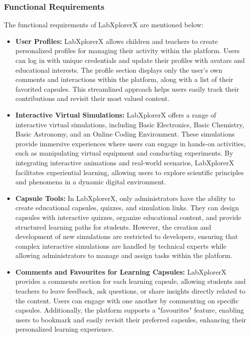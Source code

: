 \subsubsection{Functional Requirements}The functional requirements of LabXplorerX are mentioned below:
\begin{itemize}
    \item \textbf{User Profiles:}  
    LabXplorerX allows children and teachers to create personalized profiles for managing their activity within the platform. Users can log in with unique credentials and update their profiles with avatars and educational interests. The profile section displays only the user's own comments and interactions within the platform, along with a list of their favorited capsules. This streamlined approach helps users easily track their contributions and revisit their most valued content.

    \item \textbf{Interactive Virtual Simulations:} LabXplorerX offers a range of interactive virtual simulations, including Basic Electronics, Basic Chemistry, Basic Astronomy, and an Online Coding Environment. These simulations provide immersive experiences where users can engage in hands-on activities, such as manipulating virtual equipment and conducting experiments. By integrating interactive animations and real-world scenarios, LabXplorerX facilitates experiential learning, allowing users to explore scientific principles and phenomena in a dynamic digital environment.

    \item \textbf{Capsule Tools:}  
    In LabXplorerX, only administrators have the ability to create educational capsules, quizzes, and simulation links. They can design capsules with interactive quizzes, organize educational content, and provide structured learning paths for students. However, the creation and development of new simulations are restricted to developers, ensuring that complex interactive simulations are handled by technical experts while allowing administrators to manage and assign tasks within the platform.
    

    \item \textbf{Comments and Favourites for Learning Capsules:}  
    LabXplorerX provides a comments section for each learning capsule, allowing students and teachers to leave feedback, ask questions, or share insights directly related to the content. Users can engage with one another by commenting on specific capsules. Additionally, the platform supports a "favourites" feature, enabling users to bookmark and easily revisit their preferred capsules, enhancing their personalized learning experience.



\end{itemize}
